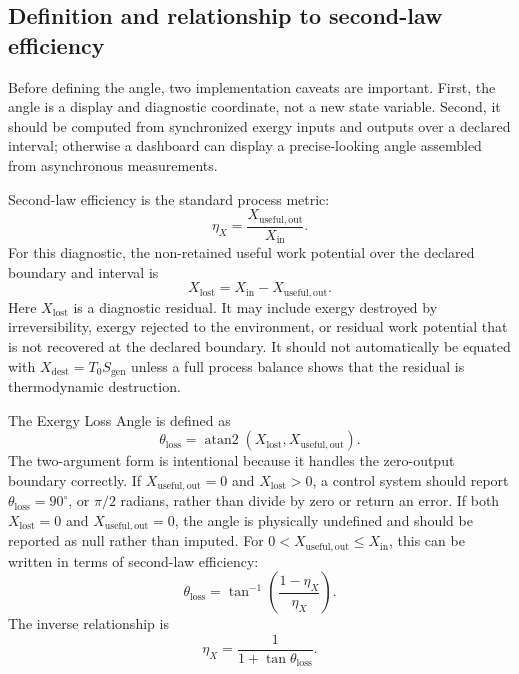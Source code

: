\documentclass[11pt]{article}
\newcommand{\thetaloss}{\theta_{\mathrm{loss}}}
\begin{document}
\subsection{Definition and relationship to second-law efficiency}

Before defining the angle, two implementation caveats are important. First, the angle is a display and diagnostic coordinate, not a new state variable. Second, it should be computed from synchronized exergy inputs and outputs over a declared interval; otherwise a dashboard can display a precise-looking angle assembled from asynchronous measurements.

Second-law efficiency is the standard process metric:
\begin{equation}
\eta_X=\frac{X_{\mathrm{useful,out}}}{X_{\mathrm{in}}}.
\end{equation}
For this diagnostic, the non-retained useful work potential over the declared boundary and interval is
\begin{equation}
X_{\mathrm{lost}}=X_{\mathrm{in}}-X_{\mathrm{useful,out}}.
\end{equation}
Here $X_{\mathrm{lost}}$ is a diagnostic residual. It may include exergy destroyed by irreversibility, exergy rejected to the environment, or residual work potential that is not recovered at the declared boundary. It should not automatically be equated with $X_{\mathrm{dest}}=T_0S_{\mathrm{gen}}$ unless a full process balance shows that the residual is thermodynamic destruction.

The Exergy Loss Angle is defined as
\begin{equation}
\thetaloss=\operatorname{atan2}(X_{\mathrm{lost}},X_{\mathrm{useful,out}}).
\end{equation}
The two-argument form is intentional because it handles the zero-output boundary correctly. If $X_{\mathrm{useful,out}}=0$ and $X_{\mathrm{lost}}>0$, a control system should report $\thetaloss=90^{\circ}$, or $\pi/2$ radians, rather than divide by zero or return an error. If both $X_{\mathrm{lost}}=0$ and $X_{\mathrm{useful,out}}=0$, the angle is physically undefined and should be reported as null rather than imputed. For $0<X_{\mathrm{useful,out}}\le X_{\mathrm{in}}$, this can be written in terms of second-law efficiency:
\begin{equation}
\thetaloss=\tan^{-1}\left(\frac{1-\eta_X}{\eta_X}\right).
\end{equation}
The inverse relationship is
\begin{equation}
\eta_X=\frac{1}{1+\tan \thetaloss}.
\end{equation}
\end{document}
